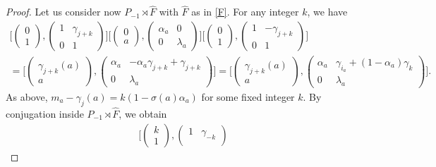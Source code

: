 \documentclass[12pt]{article}
\theoremstyle{definition}
\begin{document}
\begin{proof}
Let us consider now  $P_{-1}\rtimes \hat F$ with $\hat F$ as in \eqref{F}. For any integer $k$, we have
		$$\begin{array}{l}
		\Big[\begin{pmatrix}
		0\\
		1
		\end{pmatrix},\begin{pmatrix}
		1 & \gamma_{j+k}\\
		0&1
		\end{pmatrix}\Big]\Big[\begin{pmatrix}
		0\\
		a
		\end{pmatrix},\begin{pmatrix}
		\alpha_a & 0\\
		0&\lambda_a
		\end{pmatrix}\Big]
\Big[\begin{pmatrix}
		0\\
		1
		\end{pmatrix},\begin{pmatrix}
		1 & -\gamma_{j+k}\\
		0&1
		\end{pmatrix}\Big]\\[12pt]
=\Big[\begin{pmatrix}
		\gamma_{j+k}(a)\\
		a
		\end{pmatrix},\begin{pmatrix}
		\alpha_a & -\alpha_a\gamma_{j+k}+\gamma_{j+k}\\
		0&\lambda_a
		\end{pmatrix}\Big]
=\Big[\begin{pmatrix}
		\gamma_{j+k}(a)\\
		a
		\end{pmatrix},\begin{pmatrix}
		\alpha_a & \gamma_{i_a}+(1-\alpha_a)\gamma_k\\
		0&\lambda_a
		\end{pmatrix}\Big].
\end{array}
		$$
As above, $m_a-\gamma_j(a)=k(1-\sigma(a)\alpha_a)$ for some fixed integer $k$. By conjugation inside $P_{-1} \rtimes \hat F$, we obtain
		$$\begin{array}{l}
		\Big[\begin{pmatrix}
		k\\
		1
		\end{pmatrix},\begin{pmatrix}
		1 & \gamma_{-k}\\

\end{pmatrix}
\end{array}$$
\end{proof}
\end{document}
